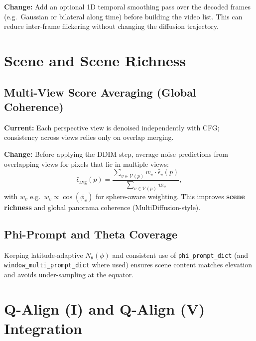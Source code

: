 \documentclass[11pt,a4paper]{article}
\newcommand{\fn}[1]{\texttt{#1}}
\begin{document}
\textbf{Change:} Add an optional 1D temporal smoothing pass over the decoded frames (e.g.\ Gaussian or bilateral along time) before building the video list. This can reduce inter-frame flickering without changing the diffusion trajectory.

\section{Scene and Scene Richness}

\subsection{Multi-View Score Averaging (Global Coherence)}

\textbf{Current:} Each perspective view is denoised independently with CFG; consistency across views relies only on overlap merging.

\textbf{Change:} Before applying the DDIM step, average noise predictions from overlapping views for pixels that lie in multiple views:
\begin{equation}
\hat{\epsilon}_{\text{avg}}(p) = \frac{\sum_{v \in \mathcal{V}(p)} w_v \cdot \hat{\epsilon}_v(p)}{\sum_{v \in \mathcal{V}(p)} w_v},
\end{equation}
with $w_v$ e.g.\ $w_v \propto \cos(\phi_v)$ for sphere-aware weighting. This improves \textbf{scene richness} and global panorama coherence (MultiDiffusion-style).

\subsection{Phi-Prompt and Theta Coverage}

Keeping latitude-adaptive $N_\theta(\phi)$ and consistent use of \fn{phi\_prompt\_dict} (and \fn{window\_multi\_prompt\_dict} where used) ensures scene content matches elevation and avoids under-sampling at the equator.

\section{Q-Align (I) and Q-Align (V) Integration}
\end{document}

